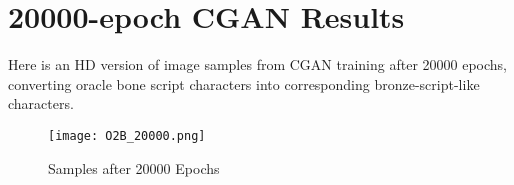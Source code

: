 \chapter{20000-epoch CGAN Results}\label{ch:appendix_4}
Here is an HD version of image samples from CGAN training after 20000 epochs, converting oracle bone script characters into corresponding bronze-script-like characters.
\begin{figure}[h]
	\centering
	\texttt{[image: O2B\_20000.png]}
	\caption{\label{fig:O2B_20000} Samples after 20000 Epochs}
\end{figure}